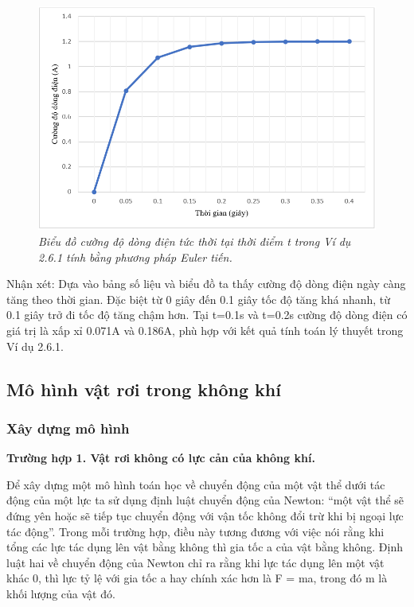 \begin{figure}[H]
	\centering
	\includegraphics[scale=0.75]{Images/hinh_2_18.png}
	\caption[Biểu đồ cường độ dòng điện tức thời tại thời điểm t trong Ví dụ 2.6.1 tính bằng phương pháp Euler tiến.
	]{\itshape\fontsize{13pt}{0pt}\selectfont\centering Biểu đồ cường độ dòng điện tức thời tại thời điểm t trong Ví dụ 2.6.1 tính bằng phương pháp Euler tiến.}
	\label{hinh2.18}
\end{figure}

\noindent Nhận xét: Dựa vào bảng số liệu và biểu đồ ta thấy cường độ dòng điện ngày càng tăng theo thời gian. Đặc biệt từ 0 giây đến 0.1 giây tốc độ tăng khá nhanh, từ 0.1 giây trở đi tốc độ tăng chậm hơn. Tại t=0.1s và t=0.2s cường độ dòng điện có giá trị là xấp xỉ 0.071A và 0.186A, phù hợp với kết quả tính toán lý thuyết trong Ví dụ 2.6.1.
\subsection{Mô hình vật rơi trong không khí}
\subsubsection{Xây dựng mô hình}
\noindent \textbf{Trường hợp 1. Vật rơi không có lực cản của không khí. }

Để xây dựng một mô hình toán học về chuyển động của một vật thể dưới tác động của một lực ta sử dụng định luật chuyển động của Newton: “một vật thể sẽ đứng yên hoặc sẽ tiếp tục chuyển động với vận tốc không đổi trừ khi bị ngoại lực tác động”. Trong mỗi trường hợp, điều này tương đương với việc nói rằng khi tổng các lực tác dụng lên vật bằng không thì gia tốc a của vật bằng không. Định luật hai về chuyển động của Newton chỉ ra rằng khi lực tác dụng lên một vật khác 0, thì lực tỷ lệ với gia tốc a hay chính xác hơn là F = ma, trong đó m là khối lượng của vật đó.

